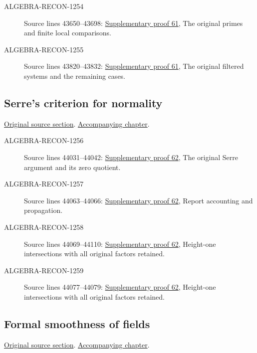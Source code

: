 \begin{description}
\item[ALGEBRA-RECON-1254] Source lines 43650--43698: \hyperlink{algebra_quasifinite_henselization_notes_20260929}{Supplementary proof 61}, The original primes and finite local comparisons.
\item[ALGEBRA-RECON-1255] Source lines 43820--43832: \hyperlink{algebra_quasifinite_henselization_notes_20260929}{Supplementary proof 61}, The original filtered systems and the remaining cases.
\end{description}

\subsection{Serre's criterion for normality}
\hypertarget{algebra-source-section-serre-criterion}{}
\noindent\href{https://github.com/stacks/stacks-project/blob/a04446e57ec1fbc252a871afcec7752fb2807b14/algebra.tex\#L43865}{Original source section}. \href{algebra.pdf\#nameddest=section-serre-criterion}{Accompanying chapter}.

\begin{description}
\item[ALGEBRA-RECON-1256] Source lines 44031--44042: \hyperlink{algebra_serre_notes_20260929}{Supplementary proof 62}, The original Serre argument and its zero quotient.
\item[ALGEBRA-RECON-1257] Source lines 44063--44066: \hyperlink{algebra_serre_notes_20260929}{Supplementary proof 62}, Report accounting and propagation.
\item[ALGEBRA-RECON-1258] Source lines 44069--44110: \hyperlink{algebra_serre_notes_20260929}{Supplementary proof 62}, Height-one intersections with all original factors retained.
\item[ALGEBRA-RECON-1259] Source lines 44077--44079: \hyperlink{algebra_serre_notes_20260929}{Supplementary proof 62}, Height-one intersections with all original factors retained.
\end{description}

\subsection{Formal smoothness of fields}
\hypertarget{algebra-source-section-p-bases}{}
\noindent\href{https://github.com/stacks/stacks-project/blob/a04446e57ec1fbc252a871afcec7752fb2807b14/algebra.tex\#L44127}{Original source section}. \href{algebra.pdf\#nameddest=section-p-bases}{Accompanying chapter}.

